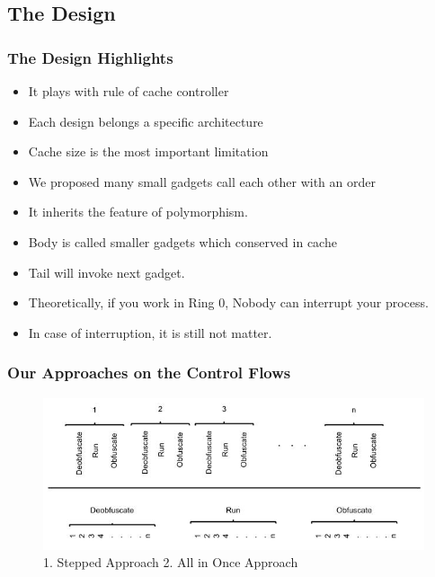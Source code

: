 \documentclass{beamer}
\begin{document}
\subsection{The Design}
\begin{frame}
	\frametitle{The Design Highlights}
	\begin{itemize}
		\item It plays with rule of cache controller
		\item Each design belongs a specific architecture
		\item Cache size is the most important limitation
		\item We proposed many small gadgets call each other with an order
		\item It inherits the feature of polymorphism.
		\item Body is called smaller gadgets which conserved in cache
		\item Tail will invoke next gadget.
		\item Theoretically, if you work in Ring 0, Nobody can interrupt your process.
		\item In case of interruption, it is still not matter.
	\end{itemize}

\end{frame}

\begin{frame}[plain]
	\frametitle{Our Approaches on the Control Flows}
		\begin{figure}
			\includegraphics[width=1\linewidth]{img/control_flow.jpg}
			\caption{1. Stepped Approach 2. All in Once Approach}

		\end{figure}
\end{frame}
\end{document}
